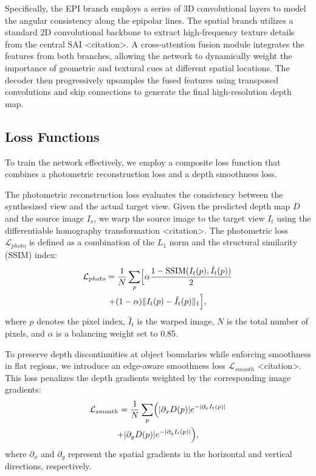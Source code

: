 \documentclass[lettersize,journal]{IEEEtran}
\begin{document}
Specifically, the EPI branch employs a series of 3D convolutional layers to model the angular consistency along the epipolar lines. The spatial branch utilizes a standard 2D convolutional backbone to extract high-frequency texture details from the central SAI <citation>. A cross-attention fusion module integrates the features from both branches, allowing the network to dynamically weight the importance of geometric and textural cues at different spatial locations. The decoder then progressively upsamples the fused features using transposed convolutions and skip connections to generate the final high-resolution depth map.

\subsection{Loss Functions}
To train the network effectively, we employ a composite loss function that combines a photometric reconstruction loss and a depth smoothness loss. 

The photometric reconstruction loss evaluates the consistency between the synthesized view and the actual target view. Given the predicted depth map $D$ and the source image $I_s$, we warp the source image to the target view $I_t$ using the differentiable homography transformation <citation>. The photometric loss $\mathcal{L}_{photo}$ is defined as a combination of the $L_1$ norm and the structural similarity (SSIM) index:
\begin{multline}

\mathcal{L}_{photo} = \frac{1}{N} \sum_{p} \Bigl[ \alpha \frac{1 - \text{SSIM}(I_t(p), \hat{I}_t(p))}{2} \\
+ (1 - \alpha) \| I_t(p) - \hat{I}_t(p) \|_1 \Bigr],
\end{multline}
where $p$ denotes the pixel index, $\hat{I}_t$ is the warped image, $N$ is the total number of pixels, and $\alpha$ is a balancing weight set to 0.85.

To preserve depth discontinuities at object boundaries while enforcing smoothness in flat regions, we introduce an edge-aware smoothness loss $\mathcal{L}_{smooth}$ <citation>. This loss penalizes the depth gradients weighted by the corresponding image gradients:
\begin{multline}

\mathcal{L}_{smooth} = \frac{1}{N} \sum_{p} \Bigl( |\partial_x D(p)| e^{-|\partial_x I_t(p)|} \\
+ |\partial_y D(p)| e^{-|\partial_y I_t(p)|} \Bigr),
\end{multline}
where $\partial_x$ and $\partial_y$ represent the spatial gradients in the horizontal and vertical directions, respectively.
\end{document}
